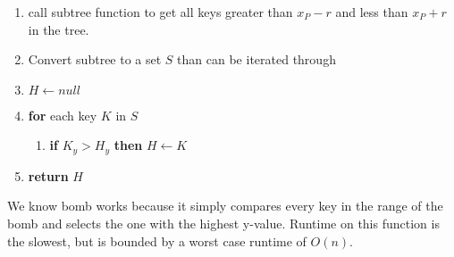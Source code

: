 \documentclass{article}
\begin{document}
\begin{enumerate}
    \item call subtree function to get all keys greater than $x_P - r$ and less than $x_P + r$ in the tree.
    \item Convert subtree to a set $S$ than can be iterated through
    \item $H \leftarrow null$
    \item \textbf{for} each key $K$ in $S$
    \begin{enumerate}
        \item \textbf{if} $K_y > H_y$ \textbf{then} $H \leftarrow K$ 
    \end{enumerate}
    \item \textbf{return} $H$ 
\end{enumerate}
We know bomb works because it simply compares every key in the range of the bomb and selects the one with the highest y-value. Runtime on this function is the slowest, but is bounded by a worst case runtime of $O(n)$.
\end{document}
